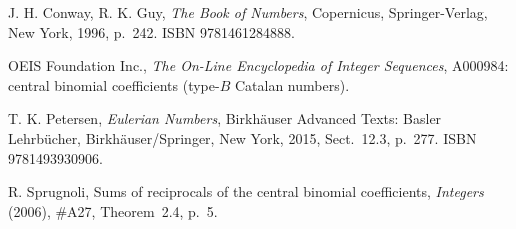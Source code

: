 J. H. Conway, R. K. Guy, {\it The Book of Numbers}, Copernicus,
Springer-Verlag, New York, 1996, p.~242. ISBN 9781461284888.

OEIS Foundation Inc., {\it The On-Line Encyclopedia of Integer Sequences},
A000984: central binomial coefficients (type-$B$ Catalan numbers).

T. K. Petersen, {\it Eulerian Numbers}, Birkh\"auser Advanced Texts:
Basler Lehrb\"ucher, Birkh\"auser/Springer, New York, 2015,
Sect.~12.3, p.~277. ISBN 9781493930906.

R. Sprugnoli, Sums of reciprocals of the central binomial coefficients,
{\it Integers}  (2006), \#A27, Theorem~2.4, p.~5.
